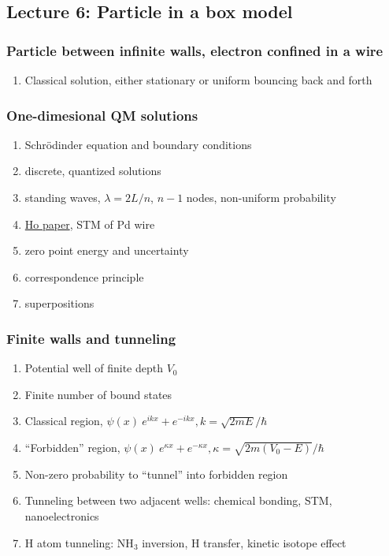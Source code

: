 \documentclass[11pt]{article}
\begin{document}
\subsection{Lecture 6: Particle in a box model}
\label{sec:orga2db0b9}
\subsubsection{Particle between infinite walls, electron confined in a wire}
\label{sec:org594c31a}
\begin{enumerate}
\item Classical solution, either stationary or uniform bouncing back and forth
\end{enumerate}
\subsubsection{One-dimesional QM solutions}
\label{sec:org9d63bb0}
\begin{enumerate}
\item Schr\"{o}dinder equation and boundary conditions
\item discrete, quantized solutions
\item standing waves, \(\lambda=2 L/n\), \(n-1\) nodes, non-uniform probability
\item \href{http://dx.doi.org/10.1021/jp053496l}{Ho paper}, STM of Pd wire
\item zero point energy and uncertainty
\item correspondence principle
\item superpositions
\end{enumerate}
\subsubsection{Finite walls and tunneling}
\label{sec:org2cb2b36}
\begin{enumerate}
\item Potential well of finite depth \(V_0\)
\item Finite number of bound states
\item Classical region, \(\psi(x) ~ e^{ikx}+e^{-ikx}, k=\sqrt{2mE}/\hbar\)
\item ``Forbidden'' region, \(\psi(x) ~ e^{\kappa x}+e^{-\kappa x},
      \kappa=\sqrt{2m(V_0-E)}/\hbar\)
\item Non-zero probability to ``tunnel'' into forbidden region
\item Tunneling between two adjacent wells: chemical bonding, STM, nanoelectronics
\item H atom tunneling: NH\(_3\) inversion, H transfer, kinetic isotope effect
\end{enumerate}
\end{document}
